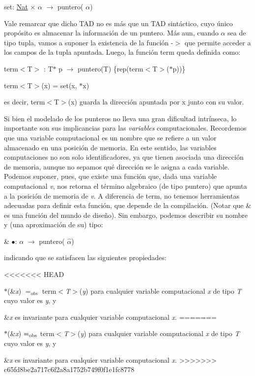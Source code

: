 \begin{DoxyItemize}
\item set\-: \hyperlink{classNat}{\-Nat} $\times$ $\alpha$ $\to$ puntero( $\alpha$)
\end{DoxyItemize}

\-Vale remarcar que dicho \-T\-A\-D no es más que un \-T\-A\-D sintáctico, cuyo único propósito es almacenar la información de un puntero. \-Más aun, cuando $\alpha$ sea de tipo tupla, vamos a suponer la existencia de la función -\/$>$ que permite acceder a los campos de la tupla apuntada. \-Luego, la función term queda definida como\-:
\begin{DoxyItemize}
\item term$<$\-T$>$ \-: \-T$\ast$ p $\to$ puntero(\-T) \{rep(term$<$\-T$>$($\ast$p))\}
\item term$<$\-T$>$(x) = set(x, $\ast$x)
\end{DoxyItemize}

es decir, term$<$\-T$>$(x) guarda la dirección apuntada por x junto con su valor.

\-Si bien el modelado de los punteros no lleva una gran dificultad intrínseca, lo importante son sus implicancias para las {\itshape variables\/} computacionales. \-Recordemos que una variable computacional es un nombre que se refiere a un valor almacenado en una posición de memoria. \-En este sentido, las variables computaciones no son solo identificadores, ya que tienen asociada una dirección de memoria, aunque no sepamos qué dirección se le asigna a cada variable. \-Podemos suponer, pues, que existe una función que, dada una variable computacional {\itshape v\/}, nos retorna el término algebraico (de tipo puntero) que apunta a la posición de memoria de {\itshape v\/}. \-A diferencia de term, no tenemos herramientas adecuadas para definir esta función, que depende de la compilación. (\-Notar que \& es una función del mundo de diseño). \-Sin embargo, podemos describir su nombre y (una aproximación de su) tipo\-:
\begin{DoxyItemize}
\item \& $\bullet$\-: $\alpha$ $\to$ puntero( $\widehat{\alpha}$)
\end{DoxyItemize}

indicando que se satisfacen las siguientes propiedades\-:
\begin{DoxyEnumerate}
<<<<<<< HEAD
\item $\ast$(\&{\itshape x\/}) $=_{obs}$ term$<${\itshape \-T$>$\/}({\itshape y\/}) para cualquier variable computacional {\itshape x\/} de tipo {\itshape \-T\/} cuyo valor es {\itshape y\/}, y
\item \&{\itshape x\/} es invariante para cualquier variable computacional {\itshape x\/}.
=======
\item $\ast$(\&{\itshape x}) $=_{\rm obs}$ term$<${\itshape T$>$}({\itshape y}) para cualquier variable computacional {\itshape x} de tipo {\itshape T} cuyo valor es {\itshape y}, y
\item \&{\itshape x} es invariante para cualquier variable computacional {\itshape x}.
>>>>>>> c65fd8be2a717c6f2a8a1752b749f0f1e1fc8778
\end{DoxyEnumerate}

